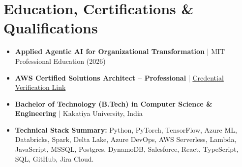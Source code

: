 \documentclass[9pt, letterpaper]{extarticle}
\begin{document}
\vfill

\section{Education, Certifications \& Qualifications}
\begin{itemize}
    \item \textbf{Applied Agentic AI for Organizational Transformation} | MIT Professional Education (2026)
    \item \textbf{AWS Certified Solutions Architect -- Professional} | \href{https://www.credly.com/badges/7ef67d8d-67f2-4036-a8bf-8bbe73098a1f/linked_in?t=teze8g}{Credential Verification Link}
    \item \textbf{Bachelor of Technology (B.Tech) in Computer Science \& Engineering} | Kakatiya University, India
    \item \textbf{Technical Stack Summary:} Python, PyTorch, TensorFlow, Azure ML, Databricks, Spark, Delta Lake, Azure DevOps, AWS Serverless, Lambda, JavaScript, MSSQL, Postgres, DynamoDB, Salesforce, React, TypeScript, SQL, GitHub, Jira Cloud.
\end{itemize}
\end{document}
